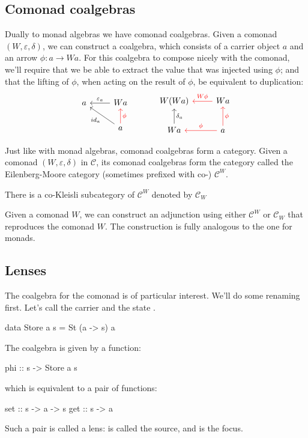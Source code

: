 \documentclass[DaoFP]{subfiles}
\begin{document}
\subsection{Comonad coalgebras}

Dually to monad algebras we have comonad coalgebras. Given a comonad $(W, \varepsilon, \delta)$, we can construct a coalgebra, which consists of a carrier object $a$ and an arrow $\phi \colon a \to W a$. For this coalgebra to compose nicely with the comonad, we'll require that we be able to extract the value that was injected using $\phi$; and that the lifting of $\phi$, when acting on the result of $\phi$, be equivalent to duplication:
\[
 \begin{tikzcd}
 a
 & W a
 \arrow[l, "\varepsilon_a"']
 \\
 & a
 \arrow[ul, "id_a"]
\arrow[u, red, "\phi"']
 \end{tikzcd}
  \hspace{30pt}
 \begin{tikzcd}
W(W a) 
&W a
\arrow[l, red, "W \phi "']
\\
W a
\arrow[u, "\delta_a"']
& a
\arrow[l, red, "\phi"']
\arrow[u, red, "\phi"']
 \end{tikzcd}
\]

Just like with monad algebras, comonad coalgebras form a category. Given a comonad $(W, \varepsilon, \delta)$ in $\mathcal{C}$, its comonad coalgebras form the category called the Eilenberg-Moore category (sometimes prefixed with co-) $\mathcal{C}^W$.

There is a co-Kleisli subcategory of $\mathcal{C}^W$ denoted by $\mathcal{C}_W$

Given a comonad $W$, we can construct an adjunction using either $\mathcal{C}^W$ or $\mathcal{C}_W$ that reproduces the comonad $W$. The construction is fully analogous to the one for monads.

\subsection{Lenses}

The coalgebra for the  comonad is of particular interest. We'll do some renaming first. Let's call the carrier  and the state . 
\begin{haskell}
data Store a s = St (a -> s) a
\end{haskell}
The coalgebra is given by a function:
\begin{haskell}
phi :: s -> Store a s
\end{haskell}
which is equivalent to a pair of functions:
\begin{haskell}
set :: s -> a -> s
get :: s -> a
\end{haskell}
Such a pair is called a lens:  is called the source, and  is the focus. 
\end{document}
